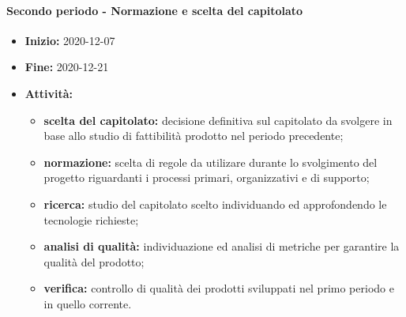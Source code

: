 \paragraph[Secondo periodo]{Secondo periodo - \textnormal{Normazione e scelta del capitolato}}
\begin{itemize}
    \item [] \textbf{Inizio:} 2020-12-07
    \item [] \textbf{Fine:} 2020-12-21
    \item [] \textbf{Attività:}
          \begin{itemize}
              \item \textbf{scelta del capitolato:} decisione definitiva sul capitolato da svolgere in base allo studio di fattibilità prodotto nel periodo precedente;
              \item \textbf{normazione:} scelta di regole da utilizare durante lo svolgimento del progetto riguardanti i processi primari, organizzativi e di supporto;
              \item \textbf{ricerca:} studio del capitolato scelto individuando ed approfondendo le tecnologie richieste;
              \item \textbf{analisi di qualità:} individuazione ed analisi di metriche per garantire la qualità del prodotto;
              \item \textbf{verifica:} controllo di qualità dei prodotti sviluppati nel primo periodo e in quello corrente.
          \end{itemize}
\end{itemize}

